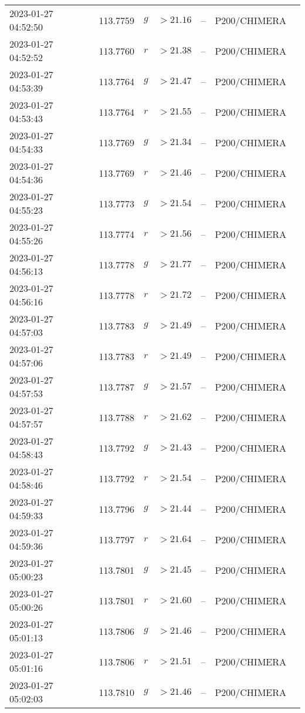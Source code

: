 \documentclass{nature_plusfigure}
\begin{document}
\begin{supplement}
\begin{center}
\begin{longtable}{lllllll}
2023-01-27 04:52:50 & 113.7759 & $g$ & $>21.16$ & -- & P200/CHIMERA &  \\ 
2023-01-27 04:52:52 & 113.7760 & $r$ & $>21.38$ & -- & P200/CHIMERA &  \\ 
2023-01-27 04:53:39 & 113.7764 & $g$ & $>21.47$ & -- & P200/CHIMERA &  \\ 
2023-01-27 04:53:43 & 113.7764 & $r$ & $>21.55$ & -- & P200/CHIMERA &  \\ 
2023-01-27 04:54:33 & 113.7769 & $g$ & $>21.34$ & -- & P200/CHIMERA &  \\ 
2023-01-27 04:54:36 & 113.7769 & $r$ & $>21.46$ & -- & P200/CHIMERA &  \\ 
2023-01-27 04:55:23 & 113.7773 & $g$ & $>21.54$ & -- & P200/CHIMERA &  \\ 
2023-01-27 04:55:26 & 113.7774 & $r$ & $>21.56$ & -- & P200/CHIMERA &  \\ 
2023-01-27 04:56:13 & 113.7778 & $g$ & $>21.77$ & -- & P200/CHIMERA &  \\ 
2023-01-27 04:56:16 & 113.7778 & $r$ & $>21.72$ & -- & P200/CHIMERA &  \\ 
2023-01-27 04:57:03 & 113.7783 & $g$ & $>21.49$ & -- & P200/CHIMERA &  \\ 
2023-01-27 04:57:06 & 113.7783 & $r$ & $>21.49$ & -- & P200/CHIMERA &  \\ 
2023-01-27 04:57:53 & 113.7787 & $g$ & $>21.57$ & -- & P200/CHIMERA &  \\ 
2023-01-27 04:57:57 & 113.7788 & $r$ & $>21.62$ & -- & P200/CHIMERA &  \\ 
2023-01-27 04:58:43 & 113.7792 & $g$ & $>21.43$ & -- & P200/CHIMERA &  \\ 
2023-01-27 04:58:46 & 113.7792 & $r$ & $>21.54$ & -- & P200/CHIMERA &  \\ 
2023-01-27 04:59:33 & 113.7796 & $g$ & $>21.44$ & -- & P200/CHIMERA &  \\ 
2023-01-27 04:59:36 & 113.7797 & $r$ & $>21.64$ & -- & P200/CHIMERA &  \\ 
2023-01-27 05:00:23 & 113.7801 & $g$ & $>21.45$ & -- & P200/CHIMERA &  \\ 
2023-01-27 05:00:26 & 113.7801 & $r$ & $>21.60$ & -- & P200/CHIMERA &  \\ 
2023-01-27 05:01:13 & 113.7806 & $g$ & $>21.46$ & -- & P200/CHIMERA &  \\ 
2023-01-27 05:01:16 & 113.7806 & $r$ & $>21.51$ & -- & P200/CHIMERA &  \\ 
2023-01-27 05:02:03 & 113.7810 & $g$ & $>21.46$ & -- & P200/CHIMERA &  \\ 

\end{longtable}
\end{center}
\end{supplement}
\end{document}
